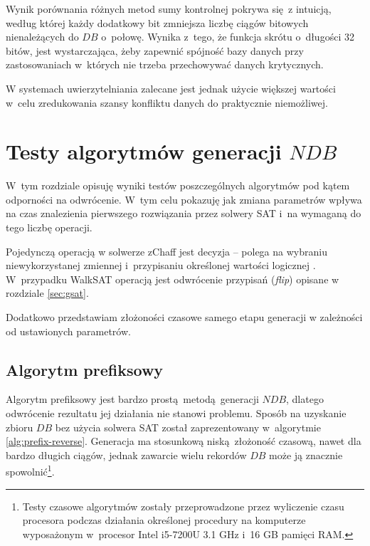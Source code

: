 Wynik porównania różnych metod sumy kontrolnej pokrywa się z intuicją, według której każdy dodatkowy bit zmniejsza liczbę ciągów bitowych
nienależących do $DB$ o~połowę. Wynika z~tego, że funkcja skrótu o~długości 32 bitów, jest wystarczająca, żeby zapewnić spójność bazy danych
przy zastosowaniach w~których nie trzeba przechowywać danych krytycznych.

W systemach uwierzytelniania zalecane jest jednak użycie większej wartości w~celu zredukowania szansy konfliktu danych do praktycznie niemożliwej.  



\section{Testy algorytmów generacji $NDB$}

W~tym rozdziale opisuję wyniki testów poszczególnych algorytmów pod kątem odporności na odwrócenie. 
W~tym celu pokazuję jak zmiana parametrów wpływa na czas znalezienia pierwszego rozwiązania przez solwery SAT i~na wymaganą do tego liczbę operacji.

Pojedynczą operacją w solwerze zChaff jest decyzja -- polega na wybraniu niewykorzystanej zmiennej i~przypisaniu określonej wartości logicznej \cite{chaff}. 
W~przypadku WalkSAT operacją jest odwrócenie przypisań (\textit{flip}) opisane w rozdziale \ref{sec:gsat}.

Dodatkowo przedstawiam złożoności czasowe samego etapu generacji w zależności od ustawionych parametrów.

\subsection{Algorytm prefiksowy}
Algorytm prefiksowy jest bardzo prostą metodą generacji $NDB$, dlatego odwrócenie rezultatu jej działania nie stanowi problemu. Sposób na uzyskanie zbioru $DB$ bez użycia solwera SAT został zaprezentowany w~algorytmie \ref{alg:prefix-reverse}.
Generacja ma stosunkową niską złożoność czasową, nawet dla bardzo długich ciągów, jednak zawarcie wielu rekordów $DB$ może ją znacznie spowolnić\footnote{Testy czasowe algorytmów zostały przeprowadzone przez wyliczenie czasu procesora podczas działania określonej procedury na komputerze wyposażonym w~procesor Intel i5-7200U 3.1 GHz i~16 GB pamięci RAM.}.

